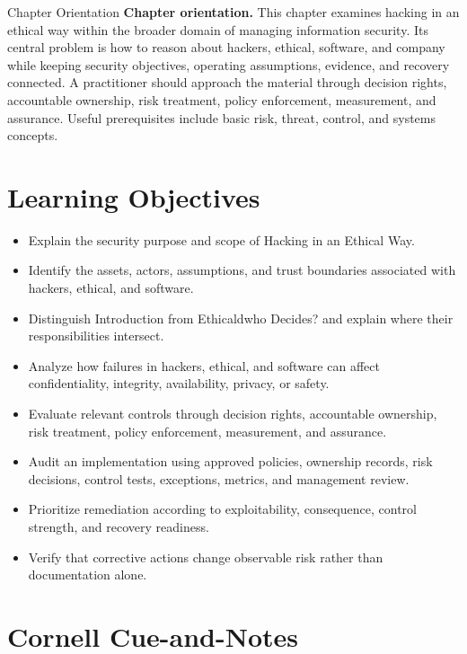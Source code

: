 \documentclass[11pt,letterpaper]{article}
\title{\CornellDocumentTitle}
\author{}
\date{}
\begin{document}
\maketitle
\begin{CornellOverviewBox}{Chapter Orientation}
\textbf{Chapter orientation.} This chapter examines hacking in an ethical way within the broader domain of managing information security. Its central problem is how to reason about hackers, ethical, software, and company while keeping security objectives, operating assumptions, evidence, and recovery connected. A practitioner should approach the material through decision rights, accountable ownership, risk treatment, policy enforcement, measurement, and assurance. Useful prerequisites include basic risk, threat, control, and systems concepts.
\end{CornellOverviewBox}
\section*{Learning Objectives}
\begin{itemize}
\item Explain the security purpose and scope of Hacking in an Ethical Way.
\item Identify the assets, actors, assumptions, and trust boundaries associated with hackers, ethical, and software.
\item Distinguish Introduction from Ethicaldwho Decides? and explain where their responsibilities intersect.
\item Analyze how failures in hackers, ethical, and software can affect confidentiality, integrity, availability, privacy, or safety.
\item Evaluate relevant controls through decision rights, accountable ownership, risk treatment, policy enforcement, measurement, and assurance.
\item Audit an implementation using approved policies, ownership records, risk decisions, control tests, exceptions, metrics, and management review.
\item Prioritize remediation according to exploitability, consequence, control strength, and recovery readiness.
\item Verify that corrective actions change observable risk rather than documentation alone.
\end{itemize}
\section*{Cornell Cue-and-Notes}
\end{document}
